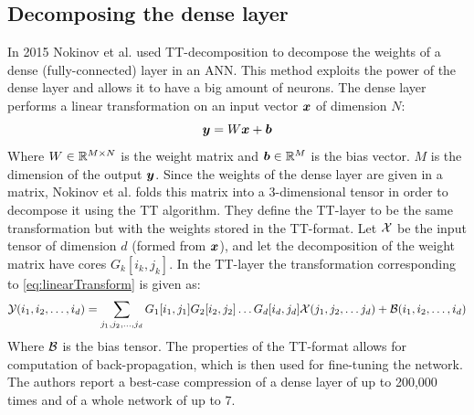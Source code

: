 \subsection{Decomposing the dense layer}
In 2015 Nokinov et al. used TT-decomposition to decompose the weights of a dense (fully-connected) layer in an ANN\cite{Novikov2015}. This method exploits the power of the dense layer and allows it to have a big amount of neurons. The dense layer performs a linear transformation on an input vector $\boldsymbol{x}$ of dimension $N$:
\begin{equation}
    \boldsymbol{y} = W \boldsymbol{x} + \boldsymbol{b}
    \label{eq:linearTransform}
\end{equation}
Where $W \in \mathbb{R}^{M\times N}$ is the weight matrix and $\boldsymbol{b} \in \mathbb{R}^{M}$ is the bias vector. $M$ is the dimension of the output $\boldsymbol{y}$. Since the weights of the dense layer are given in a matrix, Nokinov et al. folds this matrix into a 3-dimensional tensor in order to decompose it using the TT algorithm. They define the TT-layer to be the same transformation but with the weights stored in the TT-format. Let $\mathcal{X}$ be the input tensor of dimension $d$ (formed from $\boldsymbol{x}$), and let the decomposition of the weight matrix have cores $G_k[i_k, j_k]$. In the TT-layer the transformation corresponding to \eqref{eq:linearTransform} is given as:
\begin{equation}
    \mathcal{Y}(i_1, i_2, \dots, i_d) = \sum_{j_1, j_2, \dots, j_d} G_1[i_1, j_1] G_2[i_2, j_2]\dots G_d[i_d, j_d] \mathcal{X}(j_1, j_2, \dots j_d) + \mathcal{B}(i_1, i_2, \dots, i_d)
\end{equation}
Where $\mathcal{B}$ is the bias tensor. The properties of the TT-format allows for computation of back-propagation, which is then used for fine-tuning the network. The authors report a best-case compression of a dense layer of up to 200,000 times and of a whole network of up to 7.

